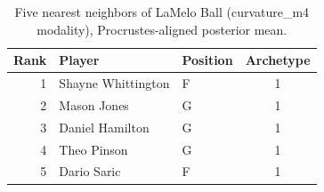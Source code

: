 \begin{table}[htbp]
  \centering\small
  \begin{tabular}{rllc}
    \toprule
    Rank & Player & Position & Archetype \\
    \midrule
    1 & Shayne Whittington & F & 1 \\
    2 & Mason Jones & G & 1 \\
    3 & Daniel Hamilton & G & 1 \\
    4 & Theo Pinson & G & 1 \\
    5 & Dario Saric & F & 1 \\
    \bottomrule
  \end{tabular}
  \caption{Five nearest neighbors of LaMelo Ball (curvature_m4 modality), Procrustes-aligned posterior mean.}
  \label{tab:LaMelo_Ball_neighbors_curvature_m4}
\end{table}


